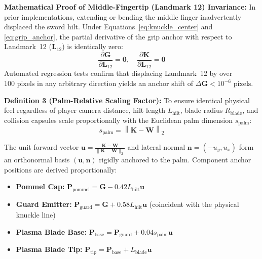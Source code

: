 \documentclass[11pt,a4paper]{article}
\begin{document}
\textbf{Mathematical Proof of Middle-Fingertip (Landmark 12) Invariance:}
In prior implementations, extending or bending the middle finger inadvertently displaced the sword hilt. Under Equations~\eqref{eq:knuckle_center} and \eqref{eq:grip_anchor}, the partial derivative of the grip anchor with respect to Landmark~12 ($\mathbf{L}_{12}$) is identically zero:
{\large
\begin{equation}
\frac{\partial \mathbf{G}}{\partial \mathbf{L}_{12}} = \mathbf{0}, \quad \frac{\partial \mathbf{K}}{\partial \mathbf{L}_{12}} = \mathbf{0}
\label{eq:invariance}
\end{equation}
}
Automated regression tests confirm that displacing Landmark~12 by over $100\text{ pixels}$ in any arbitrary direction yields an anchor shift of $\Delta \mathbf{G} < 10^{-6}\text{ pixels}$.

\begin{FormulaCard}
\textbf{\color{NavyPrimary}Definition 3 (Palm-Relative Scaling Factor):} To ensure identical physical feel regardless of player camera distance, hilt length $L_{\mathrm{hilt}}$, blade radius $R_{\mathrm{blade}}$, and collision capsules scale proportionally with the Euclidean palm dimension $s_{\mathrm{palm}}$:
{\large
\begin{equation}
s_{\mathrm{palm}} = \left\|\mathbf{K} - \mathbf{W}\right\|_2
\label{eq:palm_scale}
\end{equation}
}
\end{FormulaCard}

The unit forward vector $\mathbf{u} = \frac{\mathbf{K}-\mathbf{W}}{\|\mathbf{K}-\mathbf{W}\|_2}$ and lateral normal $\mathbf{n} = (-u_y, u_x)$ form an orthonormal basis $(\mathbf{u}, \mathbf{n})$ rigidly anchored to the palm. Component anchor positions are derived proportionally:
\begin{itemize}[noitemsep,topsep=2pt]
  \item \textbf{Pommel Cap:} $\mathbf{P}_{\mathrm{pommel}} = \mathbf{G} - 0.42 L_{\mathrm{hilt}}\mathbf{u}$
  \item \textbf{Guard Emitter:} $\mathbf{P}_{\mathrm{guard}} = \mathbf{G} + 0.58 L_{\mathrm{hilt}}\mathbf{u}$ (coincident with the physical knuckle line)
  \item \textbf{Plasma Blade Base:} $\mathbf{P}_{\mathrm{base}} = \mathbf{P}_{\mathrm{guard}} + 0.04 s_{\mathrm{palm}}\mathbf{u}$
  \item \textbf{Plasma Blade Tip:} $\mathbf{P}_{\mathrm{tip}} = \mathbf{P}_{\mathrm{base}} + L_{\mathrm{blade}}\mathbf{u}$
\end{itemize}
\end{document}
